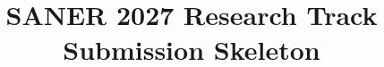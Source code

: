 \documentclass[10pt,conference]{IEEEtran}
\title{SANER 2027 Research Track Submission Skeleton}
\begin{document}
\maketitle

\ifprintreferences
  
  
\fi
\end{document}

